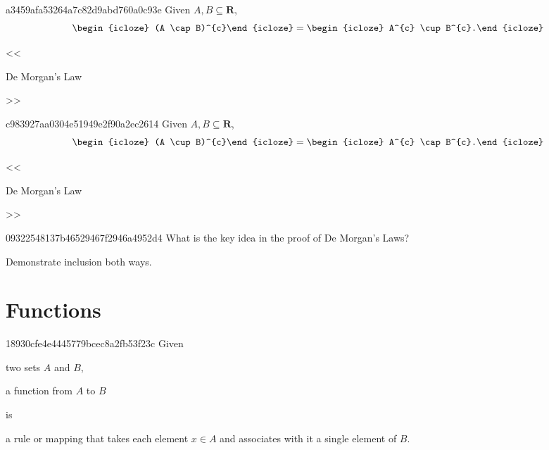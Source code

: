 \begin{note}{a3459afa53264a7c82d9abd760a0c93e}
    Given \({ A, B \subseteq \mathbf{R} }\),
    \[
        \begin{icloze}{2}(A \cap B)^{c}\end{icloze} = \begin{icloze}{1}A^{c} \cup B^{c}.\end{icloze}
    \]

    \begin{center}
        \tiny
        <<\begin{icloze}{3}De Morgan's Law\end{icloze}>>
    \end{center}
\end{note}

\begin{note}{c983927aa0304e51949e2f90a2ec2614}
    Given \({ A, B \subseteq \mathbf{R} }\),
    \[
        \begin{icloze}{2}(A \cup B)^{c}\end{icloze} = \begin{icloze}{1}A^{c} \cap B^{c}.\end{icloze}
    \]

    \begin{center}
        \tiny
        <<\begin{icloze}{3}De Morgan's Law\end{icloze}>>
    \end{center}
\end{note}

\begin{note}{09322548137b46529467f2946a4952d4}
    What is the key idea in the proof of De Morgan's Laws?

    \begin{cloze}{1}
        Demonstrate inclusion both ways.
    \end{cloze}
\end{note}

\section{Functions}
\begin{note}{18930cfe4e4445779bcec8a2fb53f23c}
    Given \begin{icloze}{3}two sets \({ A }\) and \({ B }\),\end{icloze} \begin{icloze}{2}a function from \({ A }\) to \({ B }\)\end{icloze} is \begin{icloze}{1}a rule or mapping that takes each element \({ x \in A }\) and associates with it a single element of \({ B }\).\end{icloze}
\end{note}

